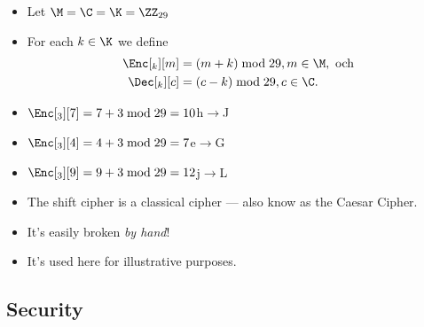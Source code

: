 \begin{frame}
  \begin{definition}\label{ShiftCipher}
    \begin{itemize}
      \item Let \(\M = \C = \K = \ZZ_{29}\)
      \item For each \(k\in \K\) we define
        \begin{align}
          \nonumber
          \Enc[_k][m] &= (m + k) \bmod 29, m\in \M, \text{\ och } \\
          \nonumber
          \Dec[_k][c] &= (c - k) \bmod 29, c\in \C.
        \end{align}
    \end{itemize}
  \end{definition}

  \pause{}

  \begin{example}
    \begin{itemize}
      \item \(\Enc[_3][7] = 7+3 \bmod 29 = 10\)\hfill h\(\to\)J
      \item \(\Enc[_3][4] = 4+3 \bmod 29 = 7\)\hfill e\(\to\)G
      \item \(\Enc[_3][9] = 9+3 \bmod 29 = 12\)\hfill j\(\to\)L
    \end{itemize}
  \end{example}
\end{frame}

\begin{frame}
  \begin{remark}
    \begin{itemize}
      \item The shift cipher is a classical cipher --- also know as the Caesar 
        Cipher.
      \item It's easily broken \emph{by hand}!
      \item It's used here for illustrative purposes.
    \end{itemize}
  \end{remark}
\end{frame}

\subsection{Security}

